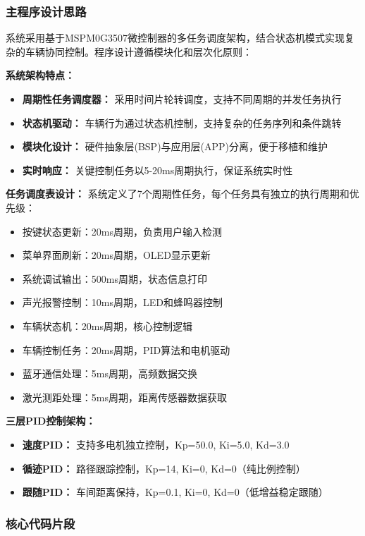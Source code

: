 \documentclass[UTF8]{ctexart}
\begin{document}
\subsubsection{主程序设计思路}
系统采用基于MSPM0G3507微控制器的多任务调度架构，结合状态机模式实现复杂的车辆协同控制。程序设计遵循模块化和层次化原则：

\textbf{系统架构特点：}
\begin{itemize}
    \item \textbf{周期性任务调度器：} 采用时间片轮转调度，支持不同周期的并发任务执行
    \item \textbf{状态机驱动：} 车辆行为通过状态机控制，支持复杂的任务序列和条件跳转
    \item \textbf{模块化设计：} 硬件抽象层(BSP)与应用层(APP)分离，便于移植和维护
    \item \textbf{实时响应：} 关键控制任务以5-20ms周期执行，保证系统实时性
\end{itemize}

\textbf{任务调度表设计：}
系统定义了7个周期性任务，每个任务具有独立的执行周期和优先级：
\begin{itemize}
    \item 按键状态更新：20ms周期，负责用户输入检测
    \item 菜单界面刷新：20ms周期，OLED显示更新
    \item 系统调试输出：500ms周期，状态信息打印
    \item 声光报警控制：10ms周期，LED和蜂鸣器控制
    \item 车辆状态机：20ms周期，核心控制逻辑
    \item 车辆控制任务：20ms周期，PID算法和电机驱动
    \item 蓝牙通信处理：5ms周期，高频数据交换
    \item 激光测距处理：5ms周期，距离传感器数据获取
\end{itemize}

\textbf{三层PID控制架构：}
\begin{itemize}
    \item \textbf{速度PID：} 支持多电机独立控制，Kp=50.0, Ki=5.0, Kd=3.0
    \item \textbf{循迹PID：} 路径跟踪控制，Kp=14, Ki=0, Kd=0（纯比例控制）
    \item \textbf{跟随PID：} 车间距离保持，Kp=0.1, Ki=0, Kd=0（低增益稳定跟随）
\end{itemize}

\subsubsection{核心代码片段}
\end{document}
